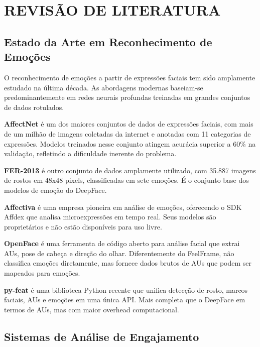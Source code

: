 \documentclass[
	12pt,
	openright,
	oneside,
	a4paper,
	english,
	brazil
	]{abntex2}
\begin{document}
\chapter{REVISÃO DE LITERATURA}
\label{cap:revisao}

\section{Estado da Arte em Reconhecimento de Emoções}

O reconhecimento de emoções a partir de expressões faciais tem sido amplamente estudado na última década. As abordagens modernas baseiam-se predominantemente em redes neurais profundas treinadas em grandes conjuntos de dados rotulados.

\textbf{AffectNet} \cite{mollahosseini2017affectnet} é um dos maiores conjuntos de dados de expressões faciais, com mais de um milhão de imagens coletadas da internet e anotadas com 11 categorias de expressões. Modelos treinados nesse conjunto atingem acurácia superior a 60\% na validação, refletindo a dificuldade inerente do problema.

\textbf{FER-2013} \cite{goodfellow2013challenges} é outro conjunto de dados amplamente utilizado, com 35.887 imagens de rostos em 48x48 pixels, classificadas em sete emoções. É o conjunto base dos modelos de emoção do DeepFace.

\textbf{Affectiva} \cite{mcduff2016affdex} é uma empresa pioneira em análise de emoções, oferecendo o SDK Affdex que analisa microexpressões em tempo real. Seus modelos são proprietários e não estão disponíveis para uso livre.

\textbf{OpenFace} \cite{baltrusaitis2018openface} é uma ferramenta de código aberto para análise facial que extrai AUs, pose de cabeça e direção do olhar. Diferentemente do FeelFrame, não classifica emoções diretamente, mas fornece dados brutos de AUs que podem ser mapeados para emoções.

\textbf{py-feat} \cite{cheong2023py} é uma biblioteca Python recente que unifica detecção de rosto, marcos faciais, AUs e emoções em uma única API. Mais completa que o DeepFace em termos de AUs, mas com maior overhead computacional.

\section{Sistemas de Análise de Engajamento}
\end{document}
